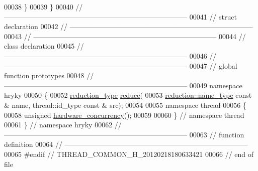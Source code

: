 \begin{DoxyCode}
00038 \textcolor{preprocessor}{}\}
00039 \}
00040 \textcolor{comment}{//
      ------------------------------------------------------------------------------}
00041 \textcolor{comment}{// struct declaration}
00042 \textcolor{comment}{//
      ------------------------------------------------------------------------------}
00043 \textcolor{comment}{//
      ------------------------------------------------------------------------------}
00044 \textcolor{comment}{// class declaration}
00045 \textcolor{comment}{//
      ------------------------------------------------------------------------------}
00046 \textcolor{comment}{//
      ------------------------------------------------------------------------------}
00047 \textcolor{comment}{// global function prototypes}
00048 \textcolor{comment}{//
      ------------------------------------------------------------------------------}
00049 \textcolor{keyword}{namespace }hryky
00050 \{
00052     \hyperlink{namespacehryky_a343a9a4c36a586be5c2693156200eadc}{reduction_type} \hyperlink{namespacehryky_af41cb3af6766761da0ff21b84527a52c}{reduce}(
00053         \hyperlink{namespacehryky_1_1reduction_ac686c30a4c8d196bbd0f05629a6b921f}{reduction::name_type} \textcolor{keyword}{const} & name, thread::id\_type \textcolor{keyword}{const} & src);
00054 
00055 \textcolor{keyword}{namespace }thread
00056 \{
00058     \textcolor{keywordtype}{unsigned} \hyperlink{namespacehryky_1_1thread_aecfbde694375a1c24e081c7c785e52a1}{hardware_concurrency}();
00059 
00060 \} \textcolor{comment}{// namespace thread}
00061 \} \textcolor{comment}{// namespace hryky}
00062 \textcolor{comment}{//
      ------------------------------------------------------------------------------}
00063 \textcolor{comment}{// function definition}
00064 \textcolor{comment}{//
      ------------------------------------------------------------------------------}
00065 \textcolor{preprocessor}{#endif // THREAD\_COMMON\_H\_20120218180633421}
00066 \textcolor{preprocessor}{}\textcolor{comment}{// end of file}
\end{DoxyCode}
